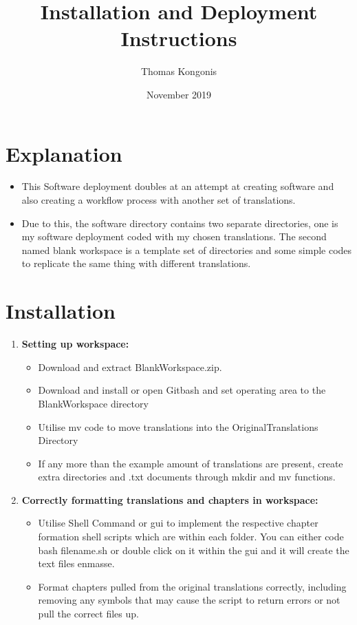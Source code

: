 \documentclass{article}
\title{Installation and Deployment Instructions}
\author{Thomas Kongonis}
\date{November 2019}
\begin{document}
\maketitle

\tableofcontents

\section{Explanation}

\begin{itemize}
\item{This Software deployment doubles at an attempt at creating software and also creating a workflow process with another set of translations.}
\item{Due to this, the software directory contains two separate directories, one is my software deployment coded with my chosen translations. The second named blank workspace is a template set of directories and some simple codes to replicate the same thing with different translations.}
\end{itemize}

\section{Installation}

\begin{enumerate}
\item{\textbf{Setting up workspace:}}

\begin{itemize}
\item{Download and extract BlankWorkspace.zip.}
\item{Download and install or open Gitbash and set operating area to the BlankWorkspace directory}
\item{Utilise mv code to move translations into the OriginalTranslations Directory}
\item{If any more than the example amount of translations are present, create extra directories and .txt documents through mkdir and mv functions.}

\end{itemize}
\vspace{10mm}

\item{\textbf{Correctly formatting translations and chapters in workspace:}}
\begin{itemize}
\item{Utilise Shell Command or gui to implement the respective chapter formation shell scripts which are within each folder. You can either code bash filename.sh or double click on it within the gui and it will create the text files enmasse.}
\item{Format chapters pulled from the original translations correctly, including removing any symbols that may cause the script to return errors or not pull the correct files up.}
\end{itemize}
\end{enumerate}
\end{document}

